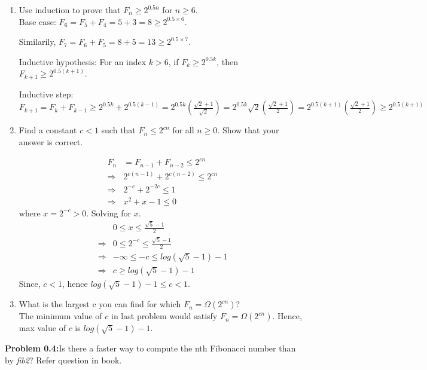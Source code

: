 \documentclass[11pt]{article}
\begin{document}
	\begin{enumerate}[label=(\alph*)]
		\item Use induction to prove that $F_n \geq 2^{0.5n}$ for $n \geq 6$.\\
		Base case: $F_6 = F_5 + F_4 = 5 + 3 = 8 \geq 2^{0.5\times 6}$.
		
		Similarily, $F_7 = F_6 + F_5 = 8 + 5 = 13 \geq 2^{0.5\times 7}$.
		
		Inductive hypothesis: For an index $k > 6$, if $F_k \geq 2^{0.5k}$, then $F_{k+1} \geq 2^{0.5(k+1)}$.
		
		Inductive step: $F_{k+1} = F_k + F_{k-1} \geq 2^{0.5k} + 2^{0.5(k-1)} = 2^{0.5k}\left(\frac{\sqrt{2} + 1}{\sqrt{2}}\right) = 2^{0.5k}\sqrt{2}\left(\frac{\sqrt{2} + 1}{2}\right) = 2^{0.5(k+1)}\left(\frac{\sqrt{2} + 1}{2}\right) \geq 2^{0.5(k+1)}$
		
		\item Find a constant $c < 1$ such that $F_n \leq 2^{cn}$ for all $n \geq 0$. Show that your answer
		is correct.
		
		\begin{align*}
		F_n &= F_{n-1} + F_{n-2} \leq 2^{cn}\\
		\Rightarrow & 2^{c(n-1)} + 2^{c(n-2)} \leq 2^{cn}\\
		\Rightarrow & 2^{-c} + 2^{-2c} \leq 1\\
		\Rightarrow & x^2 + x -1 \leq 0
		\end{align*}
		where $x = 2^{-c} > 0$. Solving for $x$.
		\begin{align*}
		& 0 \leq x \leq \frac{\sqrt{5}-1}{2}\\
		\Rightarrow & 0 \leq 2^{-c} \leq \frac{\sqrt{5}-1}{2}\\
		\Rightarrow & -\infty \leq -c \leq log(\sqrt{5}-1) - 1\\
		\Rightarrow & c \geq log(\sqrt{5}-1) - 1
		\end{align*}
		Since, $c < 1$, hence $log(\sqrt{5}-1) - 1 \leq c < 1$.
		
		\item What is the largest c you can find for which $F_n = \Omega(2^{cn})$?\\
		The minimum value of $c$ in last problem would satisfy $F_n = \Omega(2^{cn})$. Hence, max value of $c$ is $log(\sqrt{5}-1) - 1$.		
	\end{enumerate}
	
	\textbf{Problem 0.4:}Is there a faster way to compute the nth Fibonacci number than by \textit{fib2}? Refer question in book.
	
\end{document}

